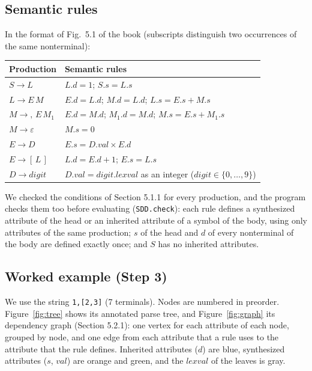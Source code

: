 \documentclass[11pt]{article}
\begin{document}
\subsection{Semantic rules}

In the format of Fig.~5.1 of the book (subscripts distinguish two occurrences
of the same nonterminal):

\begin{center}
\begin{tabular}{ll}
\toprule
Production & Semantic rules \\
\midrule
$S \to L$ & $L.d = 1$; \quad $S.s = L.s$ \\
$L \to E\,M$ & $E.d = L.d$; \quad $M.d = L.d$; \quad $L.s = E.s + M.s$ \\
$M \to ,\,E\,M_1$ & $E.d = M.d$; \quad $M_1.d = M.d$; \quad $M.s = E.s + M_1.s$ \\
$M \to \varepsilon$ & $M.s = 0$ \\
$E \to D$ & $E.s = D.val \times E.d$ \\
$E \to [\,L\,]$ & $L.d = E.d + 1$; \quad $E.s = L.s$ \\
$D \to \mathit{digit}$ & $D.val = \mathit{digit}.lexval$ as an integer \quad ($\mathit{digit} \in \{0, \ldots, 9\}$) \\
\bottomrule
\end{tabular}
\end{center}

We checked the conditions of Section 5.1.1 for every production, and the
program checks them too before evaluating (\texttt{SDD.check}): each rule
defines a synthesized attribute of the head or an inherited attribute of a
symbol of the body, using only attributes of the same production; $s$ of the
head and $d$ of every nonterminal of the body are defined exactly once; and
$S$ has no inherited attributes.

\subsection{Worked example (Step 3)}

We use the string \texttt{1,[2,3]} (7 terminals). Nodes are numbered in
preorder. Figure~\ref{fig:tree} shows its annotated parse tree, and
Figure~\ref{fig:graph} its dependency graph (Section 5.2.1): one vertex for
each attribute of each node, grouped by node, and one edge from each attribute
that a rule uses to the attribute that the rule defines. Inherited attributes
($d$) are blue, synthesized attributes ($s$, $val$) are orange and green, and
the $lexval$ of the leaves is gray.
\end{document}
